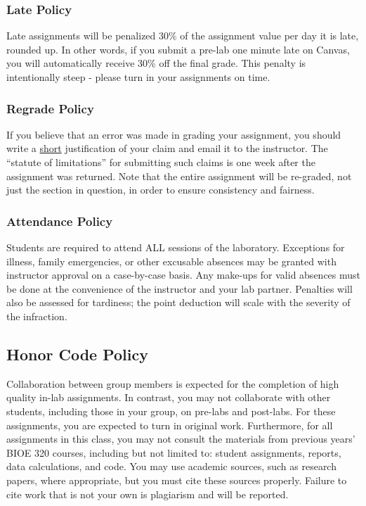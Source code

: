 \documentclass{article}
\begin{document}
\subsubsection*{Late Policy}
Late assignments will be penalized 30\% of the assignment value per day it is late, rounded up. In other words, if you submit a pre-lab one minute late on Canvas, you will automatically receive 30\% off the final grade. This penalty is intentionally steep - please turn in your assignments on time.

\subsubsection*{Regrade Policy}
If you believe that an error was made in grading your assignment, you should write a \underline{short} justification of your claim and email it to the instructor. The “statute of limitations” for submitting such claims is one week after the assignment was returned. Note that the entire assignment will be re-graded, not just the section in question, in order to ensure consistency and fairness.

\subsubsection*{Attendance Policy}
Students are required to attend ALL sessions of the laboratory. Exceptions for illness, family emergencies, or other excusable absences may be granted with instructor approval on a case-by-case basis. Any make-ups for valid absences must be done at the convenience of the instructor and your lab partner. Penalties will also be assessed for tardiness; the point deduction will scale with the severity of the infraction.

\subsection*{Honor Code Policy}
Collaboration between group members is expected for the completion of high quality in-lab assignments. In contrast, you may not collaborate with other students, including those in your group, on pre-labs and post-labs. For these assignments, you are expected to turn in original work. Furthermore, for all assignments in this class, you may not consult the materials from previous years' BIOE 320 courses, including but not limited to: student assignments, reports, data calculations, and code. You may use academic sources, such as research papers, where appropriate, but you must cite these sources properly. Failure to cite work that is not your own is plagiarism and will be reported.
\end{document}
